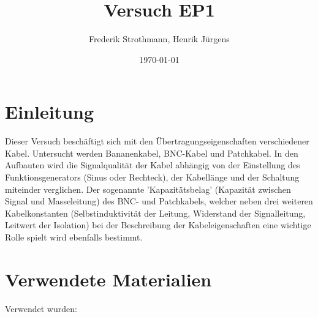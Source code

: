 \documentclass[12pt,a4paper]{article}
\title{Versuch EP1}
\author{Frederik Strothmann, Henrik Jürgens}
\date{\today}
\begin{document}
\maketitle
\newpage
\tableofcontents
\newpage




\newpage\section{Einleitung}
Dieser Versuch beschäftigt sich mit den Übertragungseigenschaften verschiedener Kabel. Untersucht werden Bananenkabel, BNC-Kabel und Patchkabel.\newline
In den Aufbauten wird die Signalqualität der Kabel abhängig von der Einstellung des Funktionsgenerators (Sinus oder Rechteck), der Kabellänge und der Schaltung miteinder verglichen.\newline
Der sogenannte 'Kapazitätsbelag' (Kapazität zwischen Signal und Masseleitung) des BNC- und Patchkabels, welcher neben drei weiteren Kabelkonstanten (Selbstinduktivität der Leitung, Widerstand der Signalleitung, Leitwert der Isolation) bei der Beschreibung der Kabeleigenschaften eine wichtige Rolle spielt wird ebenfalls bestimmt. 


\section{Verwendete Materialien}
Verwendet wurden: 
\end{document}
